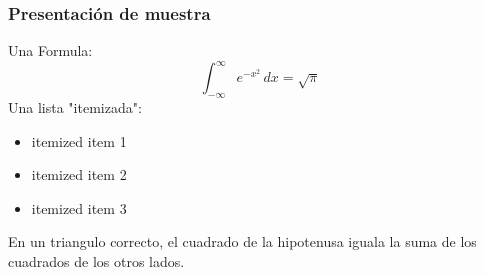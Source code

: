 \documentclass{beamer}
\begin{document}
\begin{frame}
\frametitle{Presentaci\'on de muestra}
Una Formula:
\[
\int_{-\infty}^\infty e^{-x^2} \, dx = \sqrt{\pi}
\]
Una lista "itemizada":
\begin{itemize}
\item itemized item 1
\item itemized item 2
\item itemized item 3
\end{itemize}
\begin{theorem}
En un triangulo correcto, el cuadrado de la hipotenusa
iguala la suma de los cuadrados de los otros lados.
\end{theorem}
\end{frame}
\end{document}
